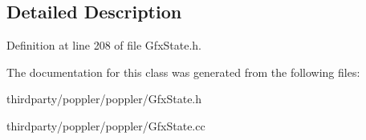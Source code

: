 \subsection{Detailed Description}


Definition at line 208 of file Gfx\+State.\+h.



The documentation for this class was generated from the following files\+:\begin{DoxyCompactItemize}
\item 
thirdparty/poppler/poppler/Gfx\+State.\+h\item 
thirdparty/poppler/poppler/Gfx\+State.\+cc\end{DoxyCompactItemize}
